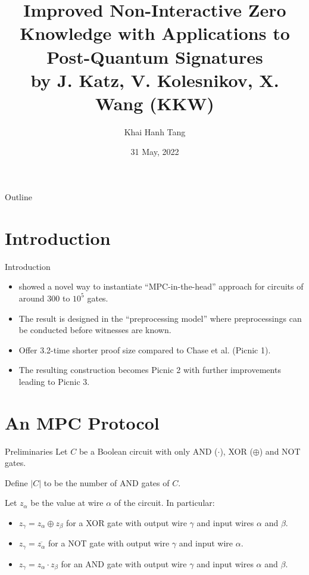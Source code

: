 \documentclass{beamer}
\title{Improved Non-Interactive Zero Knowledge with Applications to Post-Quantum Signatures\\ by  J. Katz, V. Kolesnikov, X. Wang (KKW)}
\author{Khai Hanh Tang}
\date{31 May, 2022}
\begin{document}
	
	\begin{frame}
		\titlepage
	\end{frame}
	
	\begin{frame}{Outline}
		\tableofcontents
		
	\end{frame}
	
	\section{Introduction}
	\begin{frame}{Introduction}
		\begin{itemize}
			\item \cite{KatzK018} showed a novel way to instantiate ``MPC-in-the-head'' approach \cite{IshaiKOS07} for circuits of around $300$ to $10^5$ gates.\pause
			
			\item The result is designed in the ``preprocessing model'' where preprocessings can be conducted before witnesses are known.\pause
			
			\item Offer 3.2-time shorter proof size compared to Chase et al. \cite{ChaseDGORRSZ17} (Picnic 1).\pause
			
			\item The resulting construction becomes Picnic 2 with further improvements \cite{KalesZ20} leading to Picnic 3.
		\end{itemize}
	\end{frame}
	
	\section{An MPC Protocol}
	\begin{frame}{Preliminaries}
		Let $C$ be a Boolean circuit with only AND ($\cdot$), XOR ($\oplus$) and NOT gates. \pause
		
		Define $\vert C \vert$ to be the number of AND gates of $C$.\pause
		
		Let $z_\alpha$ be the value at wire $\alpha$ of the circuit. In particular:\pause
		\begin{itemize}
			\item $z_\gamma = z_\alpha \oplus z_\beta$ for a XOR gate with output wire $\gamma$ and input wires $\alpha$ and $\beta$.\pause
			\item $z_\gamma = \overline{z_\alpha}$ for a NOT gate with output wire $\gamma$ and input wire $\alpha$.\pause
			\item $z_\gamma = z_\alpha \cdot z_\beta$ for an AND gate with output wire $\gamma$ and input wires $\alpha$ and $\beta$.
		\end{itemize}
	\end{frame}
\end{document}

